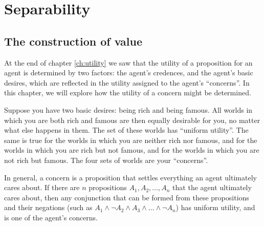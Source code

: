\chapter{Separability}\label{ch:separability}


\section{The construction of value}\label{sec:construction-value}


At the end of chapter \ref{ch:utility} we saw that the utility of a proposition
for an agent is determined by two factors: the agent's credences, and the
agent's basic desires, which are reflected in the utility assigned to the
agent's ``concerns''. In this chapter, we will explore how the utility of a
concern might be determined.

Suppose you have two basic desires: being rich and being famous. All worlds in
which you are both rich and famous are then equally desirable for you, no matter
what else happens in them. The set of these worlds has ``uniform utility''. The
same is true for the worlds in which you are neither rich nor famous, and for
the worlds in which you are rich but not famous, and for the worlds in which you
are not rich but famous. The four sets of worlds are your ``concerns''.

In general, a concern is a proposition that settles everything an agent
ultimately cares about. If there are $n$ propositions $A_1,A_2,\ldots,A_n$ that the
agent ultimately cares about, then any conjunction that can be formed from these
propositions and their negations (such as
$A_1 \land \neg A_2 \land A_3 \land \ldots \land \neg A_n$) has uniform utility,
and is one of the agent's concerns.

